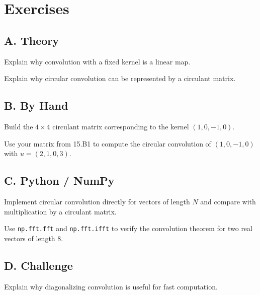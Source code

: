 \section*{Exercises}

\subsection*{A. Theory}

\begin{exercise}
Explain why convolution with a fixed kernel is a linear map.
\end{exercise}

\begin{exercise}
Explain why circular convolution can be represented by a circulant matrix.
\end{exercise}

\subsection*{B. By Hand}

\begin{exercise}
Build the $4\times 4$ circulant matrix corresponding to the kernel
$(1,0,-1,0)$.
\end{exercise}

\begin{exercise}
Use your matrix from 15.B1 to compute the circular convolution of
$(1,0,-1,0)$ with $u=(2,1,0,3)$.
\end{exercise}

\subsection*{C. Python / NumPy}

\begin{exercise}
Implement circular convolution directly for vectors of length $N$ and compare
with multiplication by a circulant matrix.
\end{exercise}

\begin{exercise}
Use \texttt{np.fft.fft} and \texttt{np.fft.ifft} to verify the convolution
theorem for two real vectors of length $8$.
\end{exercise}

\subsection*{D. Challenge}

\begin{exercise}
Explain why diagonalizing convolution is useful for fast computation.
\end{exercise}
